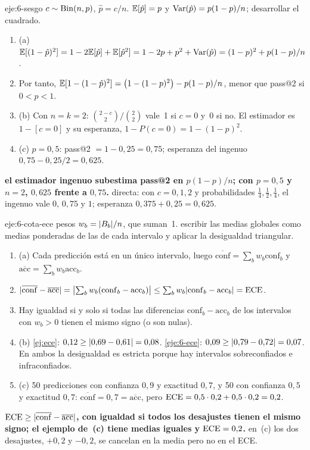 \begin{solucion}{eje:6-sesgo}
\datos $c\sim\operatorname{Bin}(n,p)$, $\hat p=c/n$.
\planteamiento $\mathbb{E}[\hat p]=p$ y $\operatorname{Var}(\hat p)=p(1-p)/n$; desarrollar el cuadrado.
\pasos
\begin{enumerate}[label=\arabic*.]
  \item (a) $\mathbb{E}[(1-\hat p)^{2}]=1-2\mathbb{E}[\hat p]+\mathbb{E}[\hat p^{2}]=1-2p+p^{2}+\operatorname{Var}(\hat p)=(1-p)^{2}+p(1-p)/n$.
  \item Por tanto, $\mathbb{E}[1-(1-\hat p)^{2}]=\bigl(1-(1-p)^{2}\bigr)-p(1-p)/n$, menor que pass@2 si $0<p<1$.
  \item (b) Con $n=k=2$: $\binom{2-c}{2}/\binom22$ vale~1 si $c=0$ y~0 si no. El estimador es $1-[c=0]$ y su esperanza, $1-P(c=0)=1-(1-p)^{2}$.
  \item (c) $p=0{,}5$: pass@2 $=1-0{,}25=0{,}75$; esperanza del ingenuo $0{,}75-0{,}25/2=0{,}625$.
\end{enumerate}
\resultado \textbf{el estimador ingenuo subestima pass@2 en $p(1-p)/n$; con $p=0{,}5$ y $n=2$, $0{,}625$ frente a $0{,}75$.}
\comprobacion directa: con $c=0,1,2$ y probabilidades $\tfrac14,\tfrac12,\tfrac14$, el ingenuo vale $0$, $0{,}75$ y $1$; esperanza $0{,}375+0{,}25=0{,}625$.
\end{solucion}

\begin{solucion}{eje:6-cota-ece}
\datos pesos $w_b=\lvert B_b\rvert/n$, que suman~1.
\planteamiento escribir las medias globales como medias ponderadas de las de cada intervalo y aplicar la desigualdad triangular.
\pasos
\begin{enumerate}[label=\arabic*.]
  \item (a) Cada predicción está en un único intervalo, luego $\overline{\mathrm{conf}}=\sum_bw_b\mathrm{conf}_b$ y $\overline{\mathrm{acc}}=\sum_bw_b\mathrm{acc}_b$.
  \item $\lvert\overline{\mathrm{conf}}-\overline{\mathrm{acc}}\rvert=\bigl\lvert\sum_bw_b(\mathrm{conf}_b-\mathrm{acc}_b)\bigr\rvert\le\sum_bw_b\lvert\mathrm{conf}_b-\mathrm{acc}_b\rvert=\operatorname{ECE}$.
  \item Hay igualdad si y solo si todas las diferencias $\mathrm{conf}_b-\mathrm{acc}_b$ de los intervalos con $w_b>0$ tienen el mismo signo (o son nulas).
  \item (b) \cref{ej:ece}: $0{,}12\ge\lvert0{,}69-0{,}61\rvert=0{,}08$. \cref{eje:6-ece}: $0{,}09\ge\lvert0{,}79-0{,}72\rvert=0{,}07$. En ambos la desigualdad es estricta porque hay intervalos sobreconfiados e infraconfiados.
  \item (c) 50 predicciones con confianza $0{,}9$ y exactitud $0{,}7$, y 50 con confianza $0{,}5$ y exactitud $0{,}7$: $\overline{\mathrm{conf}}=0{,}7=\overline{\mathrm{acc}}$, pero $\operatorname{ECE}=0{,}5\cdot 0{,}2+0{,}5\cdot 0{,}2=0{,}2$.
\end{enumerate}
\resultado \textbf{$\operatorname{ECE}\ge\lvert\overline{\mathrm{conf}}-\overline{\mathrm{acc}}\rvert$, con igualdad si todos los desajustes tienen el mismo signo; el ejemplo de~(c) tiene medias iguales y $\operatorname{ECE}=0{,}2$.}
\comprobacion en~(c) los dos desajustes, $+0{,}2$ y $-0{,}2$, se cancelan en la media pero no en el ECE.
\end{solucion}
